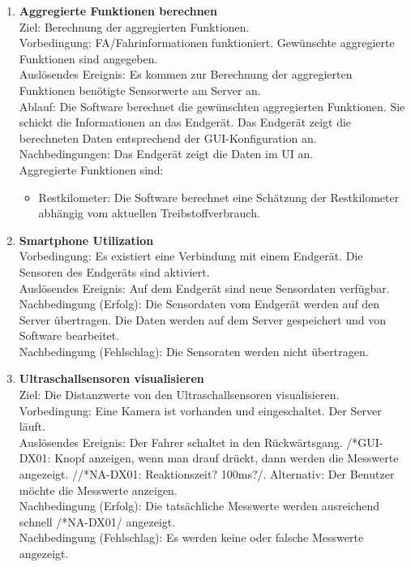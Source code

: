 \documentclass[pflichtenheft.tex]{subfiles}
\begin{document}
\begin{enumerate}
	\item{\textbf{Aggregierte Funktionen berechnen}} \\ Ziel: Berechnung der aggregierten Funktionen. \\ Vorbedingung: FA/Fahrinformationen funktioniert. Gewünschte aggregierte Funktionen sind angegeben. \\ Auslösendes Ereignis: Es kommen zur Berechnung der aggregierten Funktionen benötigte Sensorwerte am Server an. \\ Ablauf: Die Software berechnet die gewünschten aggregierten Funktionen. Sie schickt die Informationen an das Endgerät. Das Endgerät zeigt die berechneten Daten entsprechend der GUI-Konfiguration an. \\ Nachbedingungen: Das Endgerät zeigt die Daten im UI an.  \\ Aggregierte Funktionen sind:
		\begin{itemize}
			\item Restkilometer: Die Software berechnet eine Schätzung der Restkilometer abhängig vom aktuellen Treibstoffverbrauch.
		\end{itemize}

	\item{\textbf{Smartphone Utilization}}\\ Vorbedingung: Es existiert eine Verbindung mit einem Endgerät. Die Sensoren des Endgeräts sind aktiviert.\\ Auslösendes Ereignis: Auf dem Endgerät sind neue Sensordaten verfügbar. \\ Nachbedingung (Erfolg): Die Sensordaten vom Endgerät werden auf den Server übertragen. Die Daten werden auf dem Server gespeichert und von Software bearbeitet.\\  Nachbedingung (Fehlschlag): Die Sensoraten werden nicht übertragen. \\

	\item{\textbf{Ultraschallsensoren visualisieren}} \\ Ziel: Die Distanzwerte von den Ultraschallsensoren visualisieren. \\ Vorbedingung: Eine Kamera ist vorhanden und eingeschaltet. Der Server läuft. \\ Auslösendes Ereignis: Der Fahrer schaltet in den Rückwärtsgang. /*GUI-DX01: Knopf anzeigen, wenn man drauf drückt, dann werden die Messwerte angezeigt. //*NA-DX01: Reaktionszeit? 100ms?/. Alternativ: Der Benutzer möchte die Messwerte anzeigen.\\ Nachbedingung (Erfolg): Die tatsächliche Messwerte werden ausreichend schnell /*NA-DX01/ angezeigt. \\ Nachbedingung (Fehlschlag): Es werden keine oder falsche Messwerte angezeigt.


\end{enumerate}
\end{document}
